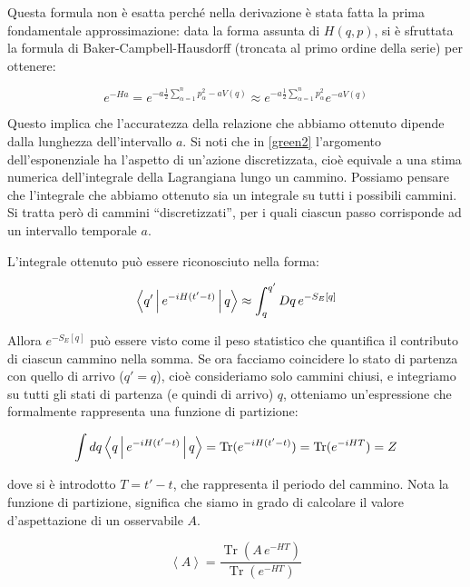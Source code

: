 \documentclass[11pt, a4paper]{article}
\DeclareMathOperator{\Tr}{Tr}
\begin{document}
Questa formula non è esatta perché nella derivazione è stata fatta la prima fondamentale approssimazione: data la forma assunta di $H(q, p)$, si è sfruttata la formula di Baker-Campbell-Hausdorff (troncata al primo ordine della serie) per ottenere:

\begin{equation}
  e^{-Ha} = e^{- a \frac{1}{2} \sum_{\alpha=1}^{n} p_{\alpha}^2 - a V(q)} \approx e^{- a \frac{1}{2} \sum_{\alpha=1}^{n} p_{\alpha}^2} e^{-a V(q)}
\end{equation}

Questo implica che l'accuratezza della relazione che abbiamo ottenuto dipende dalla lunghezza dell'intervallo $a$.
Si noti che in \eqref{green2} l'argomento dell'esponenziale ha l'aspetto di un'azione discretizzata, cioè equivale a una stima numerica dell'integrale della Lagrangiana lungo un cammino.
Possiamo pensare che l'integrale che abbiamo ottenuto sia un integrale su tutti i possibili cammini.
Si tratta però di cammini ``discretizzati'', per i quali ciascun passo corrisponde ad un intervallo temporale $a$.

L'integrale ottenuto può essere riconosciuto nella forma:

\begin{equation}
  \label{prob_distr}
  \Braket{q' | e^{-iH(t'-t)} | q} \approx \int_{q}^{q'} Dq\, e^{-S_E[q]}
\end{equation}

Allora $e^{-S_E[q]}$ può essere visto come il peso statistico che quantifica il contributo di ciascun cammino nella somma.
Se ora facciamo coincidere lo stato di partenza con quello di arrivo ($q' = q$), cioè consideriamo solo cammini chiusi, e integriamo su tutti gli stati di partenza (e quindi di arrivo) $q$, otteniamo un'espressione che formalmente rappresenta una funzione di partizione:

\begin{equation}
  \int dq \Braket{q | e^{-iH(t'-t)} | q} = \Tr(e^{-iH(t'-t)}) = \Tr(e^{-iHT}) = Z
\end{equation}

dove si è introdotto $T = t'-t$, che rappresenta il periodo del cammino.
Nota la funzione di partizione, significa che siamo in grado di calcolare il valore d'aspettazione di un osservabile $A$.

\begin{equation}
  \left\langle A \right\rangle = \frac{\Tr\left(A \, e^{-HT}\right)}{\Tr\left(e^{-HT}\right)}
\end{equation}
\end{document}
